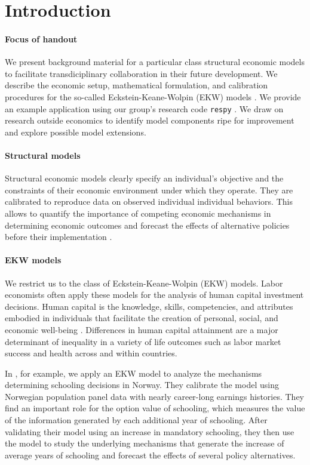 \section{Introduction}
\paragraph{Focus of handout} We present background material for a particular class structural economic models to facilitate transdiciplinary collaboration in their future development. We describe the economic setup, mathematical formulation, and calibration procedures for the so-called Eckstein-Keane-Wolpin (EKW) models \citep{Aguirregabiria.2010}. We provide an example application using our group's research code \verb+respy+ \citep{respy-1.0}. We draw on research outside economics to identify model components ripe for improvement and explore possible model extensions.

\paragraph{Structural models}  Structural economic models clearly specify an individual's objective and the constraints of their economic environment under which they operate. They are calibrated to reproduce data on observed individual individual behaviors. This allows to quantify the importance of competing economic mechanisms in determining economic outcomes and forecast the effects of alternative policies before their implementation \citep{Wolpin.2013}.

\paragraph{EKW models} We restrict us to the class of Eckstein-Keane-Wolpin (EKW) models. Labor economists often apply these models for the analysis of human capital investment decisions. Human capital is the knowledge, skills, competencies, and attributes embodied in individuals that facilitate the creation of personal, social, and economic well-being \citep{OECD.2001}. Differences in human capital attainment are a major determinant of inequality in a variety of life outcomes such as labor market success and health across and within countries.

In \citet{Bhuller.2018}, for example, we apply an EKW model to analyze the mechanisms determining schooling decisions in Norway. They calibrate the model using Norwegian population panel data with nearly career-long earnings histories. They find an important role for the option value of schooling, which measures the value of the information generated by each additional year of schooling. After validating their model using an increase in mandatory schooling, they then use the model to study the underlying mechanisms that generate the increase of average years of schooling and forecast the effects of several policy alternatives.

